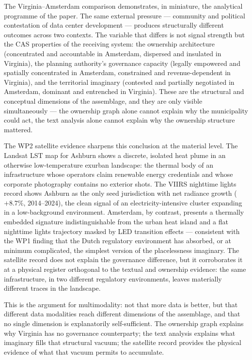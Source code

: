 The Virginia--Amsterdam comparison demonstrates, in miniature, the analytical programme of the paper. The same external pressure — community and political contestation of data center development — produces structurally different outcomes across two contexts. The variable that differs is not signal strength but the CAS properties of the receiving system: the ownership architecture (concentrated and accountable in Amsterdam, dispersed and insulated in Virginia), the planning authority's governance capacity (legally empowered and spatially concentrated in Amsterdam, constrained and revenue-dependent in Virginia), and the territorial imaginary (contested and partially negotiated in Amsterdam, dominant and entrenched in Virginia). These are the structural and conceptual dimensions of the assemblage, and they are only visible simultaneously — the ownership graph alone cannot explain why the municipality could act, the text analysis alone cannot explain why the ownership structure mattered.

The WP2 satellite evidence sharpens this conclusion at the material level. The Landsat LST map for Ashburn shows a discrete, isolated heat plume in an otherwise low-temperature exurban landscape: the thermal body of an infrastructure whose operators claim renewable energy credentials and whose corporate photography contains no exterior shots. The VIIRS nighttime lights record shows Ashburn as the only seed jurisdiction with net radiance growth ($+8.7\%$, 2014--2024), the clean signal of an electricity-intensive cluster expanding in a low-background environment. Amsterdam, by contrast, presents a thermally embedded signature indistinguishable from the urban heat island and a flat nighttime lights trajectory masked by LED transition effects --- consistent with the WP1 finding that the Dutch regulatory environment has absorbed, or at minimum complicated, the simplest version of the placelessness imaginary. The satellite record does not explain the governance difference, but it corroborates it at a physical register orthogonal to the textual and ownership evidence: the same infrastructure, in two different regulatory environments, leaves materially different traces in the landscape.

This is the argument for multimodality: not that more data is better, but that different data modalities reach different dimensions of the assemblage, and that no single dimension is explanatorily self-sufficient. The ownership graph explains why Virginia has no governance counterparty; the text analysis explains what imaginary fills that structural vacuum; the satellite record provides the physical evidence of what that vacuum permits to accumulate.
